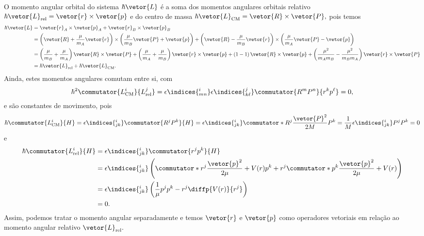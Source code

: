 O momento angular orbital do sistema \(\hbar\vetor{L}\) é a soma dos momentos angulares orbitais relativo \(\hbar\vetor{L}_\mathrm{rel} = \vetor{r}\times \vetor{p}\) e do centro de massa \(\hbar\vetor{L}_\mathrm{CM} = \vetor{R} \times \vetor{P},\) pois temos
\begin{align*}
   \hbar\vetor{L} &= \vetor{r}_A \times \vetor{p}_A + \vetor{r}_B \times \vetor{p}_B\\
                  &= \left(\vetor{R} + \frac{\mu}{m_A} \vetor{r}\right)\times \left(\frac{\mu}{m_B}\vetor{P} + \vetor{p}\right) + \left(\vetor{R} - \frac{\mu}{m_B} \vetor{r}\right)\times \left(\frac{\mu}{m_A}\vetor{P} - \vetor{p}\right)\\
                  &= \left(\frac{\mu}{m_B} + \frac{\mu}{m_A}\right)\vetor{R} \times\vetor{P} + \left(\frac{\mu}{m_A} + \frac{\mu}{m_B}\right)\vetor{r}\times\vetor{p} + \left(1 - 1\right)\vetor{R} \times \vetor{p} + \left(\frac{\mu^2}{m_Am_B} - \frac{\mu^2}{m_B m_A}\right)\vetor{r}\times\vetor{P}\\
                  &= \hbar\vetor{L}_\mathrm{rel} + \hbar\vetor{L}_\mathrm{CM}.
\end{align*}
Ainda, estes momentos angulares comutam entre si, com
\begin{equation*}
   \hbar^2\commutator{L_{\mathrm{CM}}^i}{L_{\mathrm{rel}}^j} = \epsilon\indices{^i_{mn}} \epsilon\indices{^j_{k\ell}}\commutator{R^m P^n}{r^k p^\ell} = 0,
\end{equation*}
e são constantes de movimento, pois
\begin{equation*}
   \hbar\commutator{L^i_{\mathrm{CM}}}{H} = \epsilon\indices{^i_{jk}} \commutator{R^j P^k}{H}
   = \epsilon\indices{^i_{jk}} \commutator*{R^j}{\frac{\vetor{P}^2}{2M}} P^k
   = \frac{1}{M}\epsilon\indices{^i_{jk}} P^j P^k
   = 0
\end{equation*}
e
\begin{align*}
   \hbar\commutator{L^i_{\mathrm{rel}}}{H} &= \epsilon\indices{^i_{jk}} \commutator{r^j p^k}{H}\\
                                      &= \epsilon\indices{^i_{jk}} \left(\commutator*{r^j}{\frac{\vetor{p}^2}{2\mu} + V(r)} p^k + r^j \commutator*{p^k}{\frac{\vetor{p}^2}{2\mu} + V(r)}\right)\\
                                      &= \epsilon\indices{^i_{jk}} \left(\frac{1}{\mu} p^j p^k - r^j \diffp{V(r)}{r^j}\right)\\
                                      &= 0.
\end{align*}
Assim, podemos tratar o momento angular separadamente e temos \(\vetor{r}\) e \(\vetor{p}\) como operadores vetoriais em relação ao momento angular relativo \(\vetor{L}_\mathrm{rel}.\)
